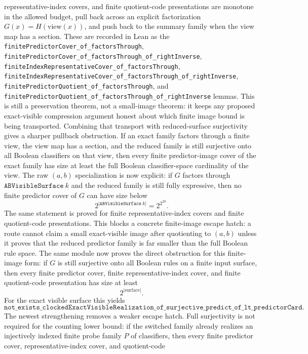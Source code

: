 \documentclass[11pt]{article}
\theoremstyle{remark}
\begin{document}
representative-index covers, and finite quotient-code presentations are
monotone in the allowed budget, pull back across an explicit factorization
\(G(x)=H(\mathrm{view}(x))\), and push back to the summary family when the view
map has a section.  These are recorded in Lean as the
\texttt{finitePredictorCover\_of\_factorsThrough},
\texttt{finitePredictorCover\_of\_factorsThrough\_of\_rightInverse},
\texttt{finiteIndexRepresentativeCover\_of\_factorsThrough},
\texttt{finiteIndexRepresentativeCover\_of\_factorsThrough\_of\_rightInverse},
\texttt{finitePredictorQuotient\_of\_factorsThrough}, and
\texttt{finitePredictorQuotient\_of\_factorsThrough\_of\_rightInverse}
lemmas.  This is still a preservation theorem, not a small-image theorem: it
keeps any proposed exact-visible compression argument honest about which finite
image bound is being transported.
Combining that transport with reduced-surface surjectivity gives a sharper
pullback obstruction.  If an exact family factors through a finite view, the
view map has a section, and the reduced family is still surjective onto all
Boolean classifiers on that view, then every finite predictor-image cover of
the exact family has size at least the full Boolean classifier-space
cardinality of the view.  The raw \((a,b)\) specialization is now explicit:
if \(G\) factors through \(\texttt{ABVisibleSurface}\ k\) and the reduced
family is still fully expressive, then no finite predictor cover of \(G\) can
have size below
\[
  2^{|\texttt{ABVisibleSurface}\ k|} = 2^{2^{2k}}.
\]
The same statement is proved for finite representative-index covers and finite
quotient-code presentations.  This blocks a concrete finite-image escape hatch:
a route cannot claim a small exact-visible image after quotienting to \((a,b)\)
unless it proves that the reduced predictor family is far smaller than the full
Boolean rule space.
The same module now proves the direct obstruction for this finite-image form:
if \(G\) is still surjective onto all Boolean rules on a finite input surface,
then every finite predictor cover, finite representative-index cover, and finite
quotient-code presentation has size at least
\[
  2^{|\text{surface}|}.
\]
For the exact visible surface this yields
\[
  \texttt{not\_exists\_clockedExactVisibleRealization\_of\_surjective\_predict\_of\_lt\_predictorCard}.
\]
The newest strengthening removes a weaker escape hatch.  Full surjectivity is
not required for the counting lower bound: if the switched family already
realizes an injectively indexed finite probe family \(P\) of classifiers, then
every finite predictor cover, representative-index cover, and quotient-code
\end{document}
